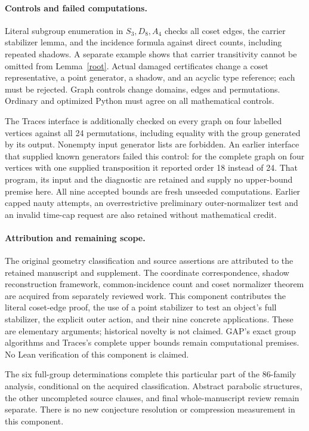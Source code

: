 \documentclass[11pt]{article}
\begin{document}
\paragraph{Controls and failed computations.}
Literal subgroup enumeration in $S_3,D_8,A_4$ checks all coset edges, the
carrier stabilizer lemma, and the incidence formula against direct counts,
including repeated shadows. A separate example shows that carrier
transitivity cannot be omitted from Lemma~\ref{root}. Actual damaged
certificates change a coset representative, a point generator, a shadow,
and an acyclic type reference; each must be rejected. Graph controls
change domains, edges and permutations. Ordinary and optimized Python
must agree on all mathematical controls.

The Traces interface is additionally checked on every graph on four
labelled vertices against all 24 permutations, including equality with
the group generated by its output. Nonempty input generator lists are
forbidden. An earlier interface that supplied known generators failed
this control: for the complete graph on four vertices with one supplied
transposition it reported order 18 instead of 24. That program, its input
and the diagnostic are retained and supply no upper-bound premise here.
All nine accepted bounds are fresh unseeded computations. Earlier capped
nauty attempts, an overrestrictive preliminary outer-normalizer test and
an invalid time-cap request are also retained without mathematical credit.

\paragraph{Attribution and remaining scope.}
The original geometry classification and source assertions are attributed
to the retained manuscript and supplement. The coordinate correspondence,
shadow reconstruction framework, common-incidence count and coset
normalizer theorem are acquired from separately reviewed work. This
component contributes the literal coset-edge proof, the use of a point
stabilizer to test an object's full stabilizer, the explicit outer action,
and their nine concrete applications. These are elementary arguments;
historical novelty is not claimed. GAP's exact group algorithms and
Traces's complete upper bounds remain computational premises. No Lean
verification of this component is claimed.

The six full-group determinations complete this particular part of the
86-family analysis, conditional on the acquired classification. Abstract
parabolic structures, the other uncompleted source clauses, and final
whole-manuscript review remain separate. There is no new conjecture
resolution or compression measurement in this component.
\end{document}
